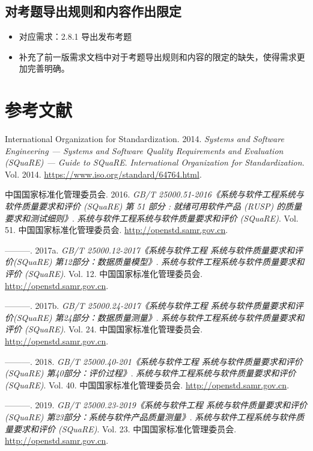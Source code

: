 \documentclass[hyperref, a4paper]{ctexart}
\providecommand{\tightlist}{%
  \setlength{\itemsep}{0pt}\setlength{\parskip}{0pt}}
\begin{document}
\hypertarget{ux5bf9ux8003ux9898ux5bfcux51faux89c4ux5219ux548cux5185ux5bb9ux4f5cux51faux9650ux5b9a}{%
\subsection{对考题导出规则和内容作出限定}\label{ux5bf9ux8003ux9898ux5bfcux51faux89c4ux5219ux548cux5185ux5bb9ux4f5cux51faux9650ux5b9a}}

\begin{itemize}
\tightlist
\item
  对应需求：2.8.1 导出发布考题
\item
  补充了前一版需求文档中对于考题导出规则和内容的限定的缺失，使得需求更加完善明确。
\end{itemize}

\pagebreak

\hypertarget{ux53c2ux8003ux6587ux732e}{%
\section*{参考文献}\label{ux53c2ux8003ux6587ux732e}}

\hypertarget{refs}{}
\leavevmode\hypertarget{ref-innovativeInternationalisation}{}%
International Organization for Standardization. 2014. \emph{Systems and
Software Engineering --- Systems and Software Quality Requirements and
Evaluation (SQuaRE) --- Guide to SQuaRE}. \emph{International
Organization for Standardization}. Vol. 2014.
\url{https://www.iso.org/standard/64764.html}.

\leavevmode\hypertarget{ref-innovative1}{}%
中国国家标准化管理委员会. 2016. \emph{GB/T
25000.51-2016《系统与软件工程系统与软件质量要求和评价 (SQuaRE) 第 51
部分 : 就绪可用软件产品 (RUSP) 的质量要求和测试细则》}.
\emph{系统与软件工程系统与软件质量要求和评价 (SQuaRE)}. Vol. 51.
中国国家标准化管理委员会. \url{http://openstd.samr.gov.cn}.

\leavevmode\hypertarget{ref-innovative3}{}%
---------. 2017a. \emph{GB/T 25000.12-2017《系统与软件工程
系统与软件质量要求和评价(SQuaRE) 第12部分：数据质量模型》}.
\emph{系统与软件工程系统与软件质量要求和评价 (SQuaRE)}. Vol. 12.
中国国家标准化管理委员会. \url{http://openstd.samr.gov.cn}.

\leavevmode\hypertarget{ref-innovative4}{}%
---------. 2017b. \emph{GB/T 25000.24-2017《系统与软件工程
系统与软件质量要求和评价(SQuaRE) 第24部分：数据质量测量》}.
\emph{系统与软件工程系统与软件质量要求和评价 (SQuaRE)}. Vol. 24.
中国国家标准化管理委员会. \url{http://openstd.samr.gov.cn}.

\leavevmode\hypertarget{ref-innovative5}{}%
---------. 2018. \emph{GB/T 25000.40-201《系统与软件工程
系统与软件质量要求和评价(SQuaRE) 第40部分：评价过程》}.
\emph{系统与软件工程系统与软件质量要求和评价 (SQuaRE)}. Vol. 40.
中国国家标准化管理委员会. \url{http://openstd.samr.gov.cn}.

\leavevmode\hypertarget{ref-innovative2}{}%
---------. 2019. \emph{GB/T 25000.23-2019《系统与软件工程
系统与软件质量要求和评价(SQuaRE) 第23部分：系统与软件产品质量测量》}.
\emph{系统与软件工程系统与软件质量要求和评价 (SQuaRE)}. Vol. 23.
中国国家标准化管理委员会. \url{http://openstd.samr.gov.cn}.
\end{document}
